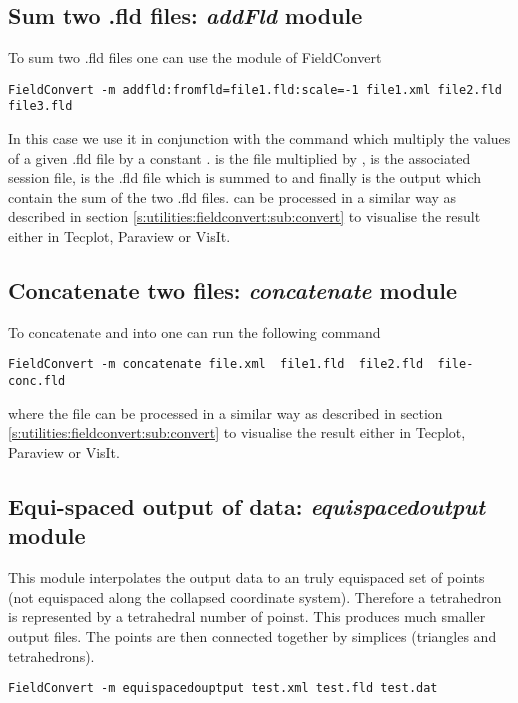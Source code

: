 \subsection{Sum two .fld files: \textit{addFld} module}
To sum two .fld files one can use the  module of FieldConvert
%
\begin{lstlisting}[style=BashInputStyle]
FieldConvert -m addfld:fromfld=file1.fld:scale=-1 file1.xml file2.fld file3.fld
\end{lstlisting}
%
In this case we use it in conjunction with the command  
which multiply the values of a given .fld file by a constant . 
 is the file multiplied by ,  
is the associated session file,  is the .fld file which 
is summed to  and finally  is the output 
which contain the sum of the two .fld files.
 can be processed in a similar way as described 
in section \ref{s:utilities:fieldconvert:sub:convert} to visualise 
the result either in Tecplot, Paraview or VisIt.
%
%
%
\subsection{Concatenate two files: \textit{concatenate} module}
To concatenate  and  into 
one can run the following command
%
\begin{lstlisting}[style=BashInputStyle]
FieldConvert -m concatenate file.xml  file1.fld  file2.fld  file-conc.fld
\end{lstlisting}
%
where the file  can be processed in a similar 
way as described in section \ref{s:utilities:fieldconvert:sub:convert}
to visualise the result either in Tecplot, Paraview or VisIt.
%
%
%
\subsection{Equi-spaced output of data: \textit{equispacedoutput} module}
This module interpolates the output data to an truly equispaced set of
points (not equispaced along the collapsed coordinate
system). Therefore a tetrahedron is represented by a tetrahedral
number of poinst. This produces much smaller output files. The points
are then connected together by simplices (triangles and tetrahedrons).

\begin{lstlisting}[style=BashInputStyle]
FieldConvert -m equispacedouptput test.xml test.fld test.dat
\end{lstlisting}

